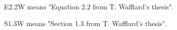 \documentclass[11pt,table,xcdraw]{report}
\begin{document}





E2.2W means "Equation 2.2 from T. Wafflard's thesis".

S1.3W means "Section 1.3 from T. Wafflard's thesis".



\appendix

% 
% 

%
\end{document}
